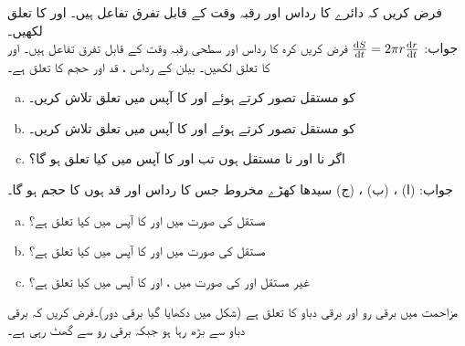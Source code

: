 %
فرض کریں کہ دائرے کا رداس  اور رقبہ  وقت  کے قابل تفرق تفاعل ہیں۔  اور  کا تعلق لکھیں۔\\
جواب:\quad
$\tfrac{\dif S}{\dif t}=2\pi r\tfrac{\dif r}{\dif t}$
فرض کریں کرہ کا رداس  اور سطحی رقبہ  وقت  کے قابل تفرق تفاعل ہیں۔ اور  کا تعلق لکھیں۔
بیلن کے رداس ، قد  اور حجم  کا تعلق  ہے۔
\begin{enumerate}[a.]
\item
{} کو مستقل تصور کرتے ہوئے  اور  کا آپس میں تعلق تلاش کریں۔
\item
{} کو مستقل تصور کرتے ہوئے  اور  کا آپس میں تعلق تلاش کریں۔
\item
اگر نا  اور نا  مستقل ہوں تب   اور   کا آپس میں کیا تعلق ہو گا؟

\end{enumerate}
جواب:\quad
(ا) ، (ب) ، (ج) 
سیدھا کھڑے مخروط جس کا رداس  اور قد  ہوں کا  حجم    ہو گا۔
\begin{enumerate}[a.]
\item
مستقل  کی صورت میں  اور  کا آپس میں کیا تعلق ہے؟
\item
مستقل  کی صورت میں  اور  کا آپس میں کیا تعلق ہے؟
\item
غیر مستقل  اور  کی صورت میں  ،  اور  کا آپس میں کیا تعلق ہے؟
\end{enumerate}
مزاحمت  میں برقی رو  اور برقی دباو  کا تعلق  ہے (شکل  میں دکھایا گیا برقی دور)۔فرض کریں کہ  برقی دباو  سے بڑھ رہا ہو جبکہ برقی رو  سے گھٹ رہی ہے۔

